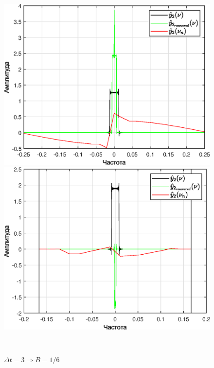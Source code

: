 \documentclass[a4paper]{article}
\begin{document}
\begin{figure}[H]
    \begin{minipage}{0.5\textwidth}
        \centering \includegraphics[width=\textwidth]{graphs2/T_50_dt_2_B_0.25_dv_0.02/func2_image.eps}
        \caption{$\Delta t = 2 \Rightarrow B = 0.25$}
    \end{minipage}\hfill
    \begin{minipage}{0.5\textwidth}
        \centering \includegraphics[width=\textwidth]{graphs2/T_50_dt_3_B_0.16667_dv_0.02/func2_image.eps}
        \caption{$\Delta t = 3 \Rightarrow B = 1/6$}
    \end{minipage}\\[1em]
\end{figure}\noindent\
\end{document}
